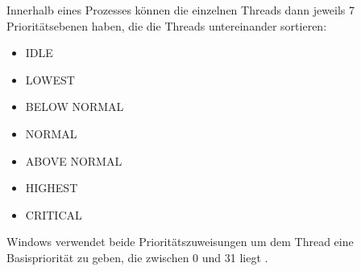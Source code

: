 Innerhalb eines Prozesses können die einzelnen Threads dann jeweils 7 Prioritätsebenen haben, die die Threads untereinander sortieren:
\begin{multicols}{3}
    \begin{itemize}[noitemsep]
        \item IDLE
        \item LOWEST
        \item BELOW NORMAL
        \item NORMAL
        \item ABOVE NORMAL
        \item HIGHEST
        \item CRITICAL
    \end{itemize}
\end{multicols}

Windows verwendet beide Prioritätszuweisungen um dem Thread eine Basispriorität zu geben, die zwischen 0 und 31 liegt \autocite[vgl.]{KarlBridgeMicrosoft.2023}.

